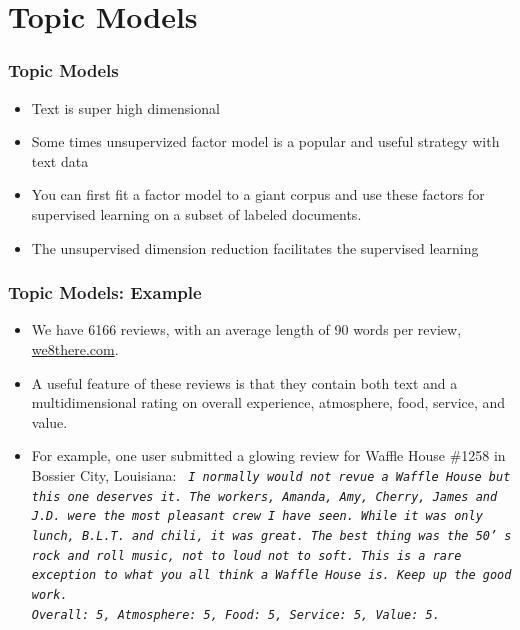 \documentclass[
  shownotes,
  xcolor={svgnames},
  hyperref={colorlinks,citecolor=DarkBlue,linkcolor=DarkRed,urlcolor=DarkBlue}
  , aspectratio=169]{beamer}
\begin{document}
\section{Topic Models}
\begin{frame}
\frametitle{Topic Models}

\begin{itemize}
\item Text is super high dimensional
\medskip
\item Some times unsupervized factor model is a popular and useful strategy with text data
\medskip
\item You can first fit a factor model to a giant corpus and use these factors for supervised learning on a subset of labeled documents.
\medskip
\item The unsupervised dimension reduction facilitates the supervised learning
\end{itemize}
\end{frame}
\begin{frame}
\frametitle{Topic Models: Example}

\begin{itemize}


\item We have 6166 reviews, with an average length of 90 words per review, \url{we8there.com}. 
\medskip
\item A useful feature of these reviews is that they contain both text and a multidimensional rating on overall experience, atmosphere, food, service, and value. 
\medskip
\item For example, one user submitted a glowing review for Waffle House \#1258 in Bossier City, Louisiana: 
\medskip
{\tt \it 
I normally would not revue a Waffle House but this one deserves it. The workers, Amanda, Amy, Cherry, James and J.D. were the most pleasant crew I have seen. While it was only lunch, B.L.T. and chili, it was great. The best thing was the 50’ s rock and roll music, not to loud not to soft. This is a rare exception to what you all think a Waffle House is. Keep up the good work. \\
Overall: 5, Atmosphere: 5, Food: 5, Service: 5, Value: 5. 
}
\end{itemize}
\end{frame}
\end{document}
